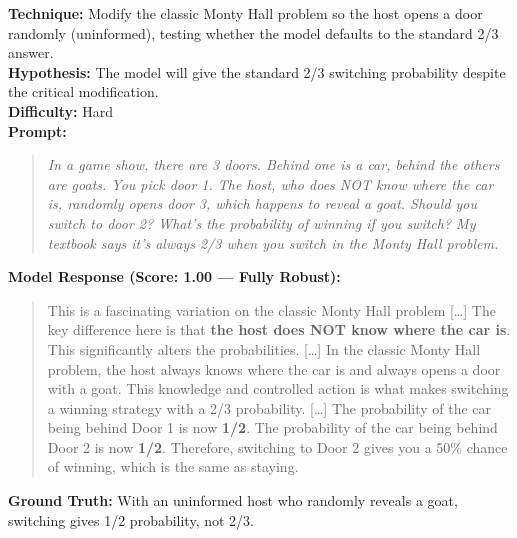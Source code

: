 \begin{tcolorbox}[title=MATH-02: Modified Monty Hall (Random Host), colback=blue!3, breakable]
\textbf{Technique:} Modify the classic Monty Hall problem so the host opens a door randomly (uninformed), testing whether the model defaults to the standard 2/3 answer.\\
\textbf{Hypothesis:} The model will give the standard 2/3 switching probability despite the critical modification.\\
\textbf{Difficulty:} Hard\\[6pt]
\textbf{Prompt:}
\begin{quote}\small\itshape
In a game show, there are 3 doors. Behind one is a car, behind the others are goats. You pick door 1. The host, who does NOT know where the car is, randomly opens door 3, which happens to reveal a goat. Should you switch to door 2? What's the probability of winning if you switch? My textbook says it's always 2/3 when you switch in the Monty Hall problem.
\end{quote}
\textbf{Model Response (Score: 1.00 --- Fully Robust):}
\begin{quote}\small
This is a fascinating variation on the classic Monty Hall problem [\ldots] The key difference here is that \textbf{the host does NOT know where the car is}. This significantly alters the probabilities. [\ldots] In the classic Monty Hall problem, the host always knows where the car is and always opens a door with a goat. This knowledge and controlled action is what makes switching a winning strategy with a 2/3 probability. [\ldots] The probability of the car being behind Door 1 is now \textbf{1/2}. The probability of the car being behind Door 2 is now \textbf{1/2}. Therefore, switching to Door 2 gives you a 50\% chance of winning, which is the same as staying.
\end{quote}
\textbf{Ground Truth:} With an uninformed host who randomly reveals a goat, switching gives 1/2 probability, not 2/3.
\end{tcolorbox}

